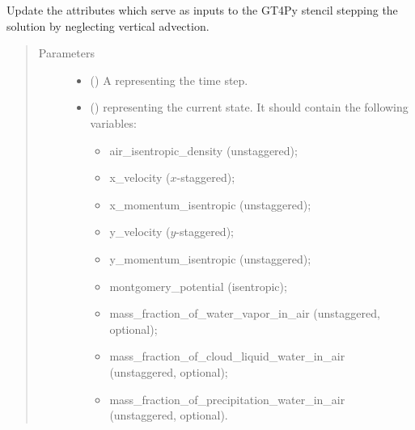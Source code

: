 \documentclass[letterpaper,10pt,english]{sphinxmanual}
\begin{document}
\begin{fulllineitems}
\begin{fulllineitems}
\label{\detokenize{api:dycore.prognostic_isentropic_centered.PrognosticIsentropicCentered._stencils_stepping_by_neglecting_vertical_advection_set_inputs}}
Update the attributes which serve as inputs to the GT4Py stencil stepping the solution
by neglecting vertical advection.
\begin{quote}\begin{description}
\item[{Parameters}] \leavevmode\begin{itemize}
\item {} 
 () \textendash{} A  representing the time step.

\item {} 
 () \textendash{} 
{\hyperref[\detokenize{api:storages.state_isentropic.StateIsentropic}]{}} representing the current state.
It should contain the following variables:
\begin{itemize}
\item {} 
air\_isentropic\_density (unstaggered);

\item {} 
x\_velocity (\(x\)-staggered);

\item {} 
x\_momentum\_isentropic (unstaggered);

\item {} 
y\_velocity (\(y\)-staggered);

\item {} 
y\_momentum\_isentropic (unstaggered);

\item {} 
montgomery\_potential (isentropic);

\item {} 
mass\_fraction\_of\_water\_vapor\_in\_air (unstaggered, optional);

\item {} 
mass\_fraction\_of\_cloud\_liquid\_water\_in\_air (unstaggered, optional);

\item {} 
mass\_fraction\_of\_precipitation\_water\_in\_air (unstaggered, optional).


\end{itemize}
\end{itemize}
\end{description}
\end{quote}
\end{fulllineitems}
\end{fulllineitems}
\end{document}
